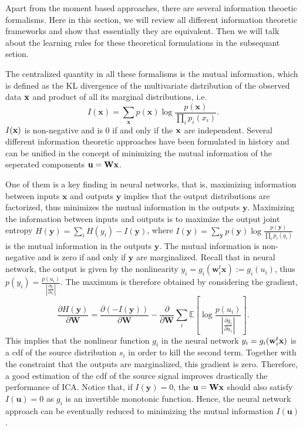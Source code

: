 \documentclass[aps,prl,preprint,superscriptaddress]{revtex4-2}
\begin{document}
Apart from the moment based approaches, there are several information theoetic formalisms. Here in this section, we will review all different information theoretic frameworks and show that essentially they are equivalent. Then we will talk about the learning rules for these theoretical formulations in the subsequant setion. 

The centralized quantity in all these formalisms is the mutual information, which is defined as the KL divergence of the multivariate distribution of the observed data $\bf{x}$ and product of all its marginal distributions, i.e. 
\begin{equation}
I(\mathbf{x}) = \sum_{\mathbf{x}}p(\mathbf{x})\log\frac{p(\mathbf{x})}{\prod_{i}p_{i}(x_{i})}.
\end{equation} $I(\bf{x})$ is non-negative and is 0 if and only if the $\bf{x}$ are independent. Several different information theoretic approaches have been formulated in history and can be unified in the concept of minimizing the mutual information of the seperated components $\bf{u} = \bf{W}\bf{x}$. 

One of them is a key finding in neural networks, that is, maximizing information between inputs $\mathbf{x}$ and outputs $\mathbf{y}$ implies that the output distributions are factorized, thus minimizes the mutual information in the outputs $\mathbf{y}$. Maximizing the information between inputs and outputs is to maximize the output joint entropy $H(\mathbf{y}) = \sum_{i}H(y_{i}) - I(\mathbf{y})$, where $I(\mathbf{y}) = \sum_{\mathbf{y}}p(\mathbf{y})\log\frac{p(\mathbf{y})}{\prod_{i}p_{i}(y_{i})}$ is the mutual information in the outputs $\mathbf{y}$. The mutual information is non-negative and is zero if and only if $\mathbf{y}$ are marginalized. Recall that in neural network, the output is given by the nonlinearity $y_{i} = g_{i}(\mathbf{w}_{i}^{t}\mathbf{x}) := g_{i}(u_{i})$, thus $p(y_{i}) = \frac{p(u_{i})}{|\frac{\partial g_{i}}{\partial u_{i}}|}$. The maximum is therefore obtained by considering the gradient,
\begin{equation}
\frac{\partial H(\mathbf{y})}{\partial \mathbf{W}} = \frac{\partial (-I(\mathbf{y}))}{\partial \mathbf{W}} -\frac{\partial}{\partial \mathbf{W}}\sum_{i} \mathbb{E}[\log \frac{p(u_{i})}{|\frac{\partial g_{i}}{\partial u_{i}}|} ]. 
\end{equation}
This implies that the nonlinear function $g_{i}$ in the neural network $y_{i} = g_{i}(\mathbf{w}_{i}^{t}\bf{x})$ is a cdf of the source distribution $s_{i}$ in order to kill the second term. Together with the constraint that the outputs are marginalized, this gradient is zero. Therefore, a good estimation of the cdf of the source signal improves drastically the performance of ICA. Notice that, if $I(\mathbf{y}) = 0$, the $\mathbf{u} = \bf{W}\bf{x}$ should also satisfy $I(\mathbf{u}) = 0$ as $g_{i}$ is an invertible monotonic function. Hence, the neural network approach can be eventually reduced to minimizing the mutual information $I(\mathbf{u})$.
\end{document}
